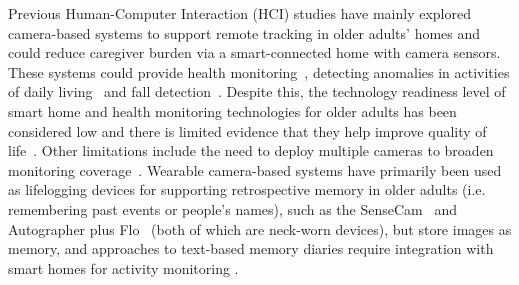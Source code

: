 Previous Human-Computer Interaction (HCI) studies have mainly explored camera-based systems to support remote tracking in older adults' homes and could reduce caregiver burden via a smart-connected home with camera sensors. These systems could provide health monitoring~\cite{abowd2002aware}, detecting anomalies in activities of daily living~\cite{buzzelli2020vision} and fall detection~\cite{de2017home}.
Despite this, the technology readiness level of smart home and health monitoring technologies for older adults has been considered low and there is limited evidence that they help improve quality of life~\cite{liu2016smart}. Other limitations include the need to deploy multiple cameras to broaden monitoring coverage~\cite{hasan2019real}. %
Wearable camera-based systems have primarily been used as lifelogging devices for supporting retrospective memory in older adults (i.e. remembering past events or people's names), such as the SenseCam~\cite{hodges2006sensecam,dubourg2016sensecam} and Autographer plus Flo~\cite{molesworth2016evaluation} (both of which are neck-worn devices), but store images as memory, and approaches to text-based memory diaries require integration with smart homes for activity monitoring \cite{dahmen2018design}.

